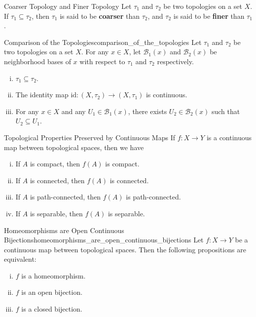 \documentclass{report}
\begin{document}
\begin{definition}{Coarser Topology and Finer Topology}{}
	Let $\tau_1$ and $\tau_2$ be two topologies on a set $X$. If $\tau_1\subseteq\tau_2$, then $\tau_1$ is said to be \textbf{coarser} than $\tau_2$, and $\tau_2$ is said to be \textbf{finer} than $\tau_1$.
\end{definition}

\begin{proposition}{Comparison of the Topologies}{comparison_of_the_topologies}
	Let $\tau_1$ and $\tau_2$ be two topologies on a set $X$. For any $x\in X$, let $\mathcal{B}_1(x)$ and $\mathcal{B}_2(x)$ be neighborhood bases of $x$ with respect to $\tau_1$ and $\tau_2$ respectively.
	\begin{enumerate}[(i)]
		\item $\tau_1 \subseteq \tau_2$.
		\item The identity map $\mathrm{id}: (X, \tau_2) \to (X, \tau_1)$ is continuous.
		\item For any $x \in X$ and any $U_1 \in \mathcal{B}_1(x)$, there exists $U_2 \in \mathcal{B}_2(x)$ such that $U_2 \subseteq U_1$.
	\end{enumerate}
\end{proposition}

\begin{proposition}{Topological Properties Preserved by Continuous Maps}{}
	If $f:X\to Y$ is a continuous map between topological spaces, then we have
	\begin{enumerate}[(i)]
		\item If $A$ is compact, then $f(A)$ is compact.
		\item If $A$ is connected, then $f(A)$ is connected.
		\item If $A$ is path-connected, then $f(A)$ is path-connected.
		\item If $A$ is separable, then $f(A)$ is separable.
	\end{enumerate}
\end{proposition}





\begin{proposition}{Homeomorphisms are Open Continuous Bijections}{homeomorphisms_are_open_continuous_bijections}
	Let $f:X\to Y$ be a continuous map between topological spaces. Then the following propositions are equivalent:
	\begin{enumerate}[(i)]
		\item $f$ is a homeomorphism.
		\item $f$ is an open bijection.
		\item $f$ is a closed bijection.
	\end{enumerate}
\end{proposition}
\end{document}
